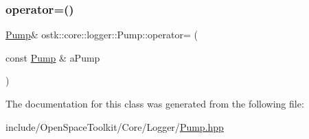 \mbox{\label{classostk_1_1core_1_1logger_1_1_pump_adaca719cdabd4a6f6e8937bacf093b77}} 
\subsubsection{\texorpdfstring{operator=()}{operator=()}}
{\footnotesize\ttfamily \hyperlink{classostk_1_1core_1_1logger_1_1_pump}{Pump}\& ostk\+::core\+::logger\+::\+Pump\+::operator= (\begin{DoxyParamCaption}\item[{const \hyperlink{classostk_1_1core_1_1logger_1_1_pump}{Pump} \&}]{a\+Pump }\end{DoxyParamCaption})\hspace{0.3cm}{\ttfamily [delete]}}



The documentation for this class was generated from the following file\+:\begin{DoxyCompactItemize}
\item 
include/\+Open\+Space\+Toolkit/\+Core/\+Logger/\hyperlink{_pump_8hpp}{Pump.\+hpp}\end{DoxyCompactItemize}
